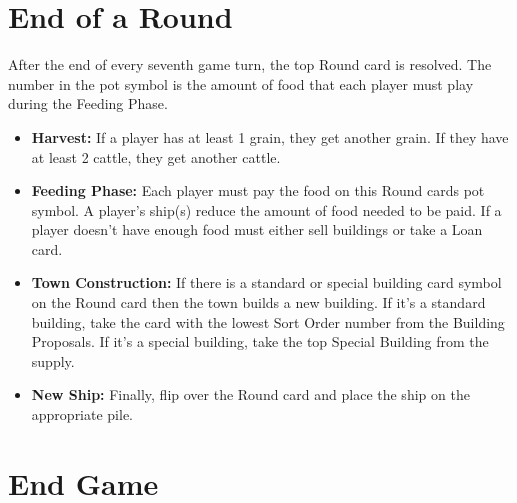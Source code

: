 \documentclass[12pt]{article}
\newenvironment{itemizeCustom}
{\begin{itemize}
  \setlength{\itemsep}{1pt}
  \setlength{\parskip}{0pt}
  \setlength{\parsep}{0pt}}
{\end{itemize}}
\begin{document}
\begin{multicols*}{2}
\section*{End of a Round}
After the end of every seventh game turn, the top Round card is resolved. The number in the pot symbol is the amount of food that each player must play during the Feeding Phase.
\begin{itemizeCustom}
	\item \textbf{Harvest:} If a player has at least 1 grain, they get another grain. If they have at least 2 cattle, they get another cattle.
	\item \textbf{Feeding Phase:} Each player must pay the food on this Round cards pot symbol. A player's ship(s) reduce the amount of food needed to be paid. If a player doesn't have enough food must either sell buildings or take a Loan card.
	\item \textbf{Town Construction:} If there is a standard or special building card symbol on the Round card then the town builds a new building. If it's a standard building, take the card with the lowest Sort Order number from the Building Proposals. If it's a special building, take the top Special Building from the supply.
	\item \textbf{New Ship:} Finally, flip over the Round card and place the ship on the appropriate pile.
\end{itemizeCustom}

\section*{End Game}

\end{multicols*}
\end{document}
